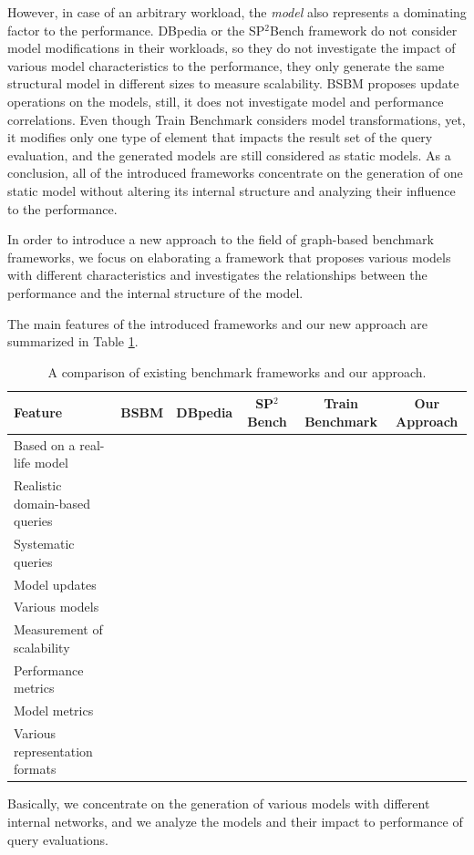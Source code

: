 However, in case of an arbitrary workload, the \textit{model} also represents a dominating factor to the performance. DBpedia or the SP$^2$Bench framework do not consider model modifications in their workloads, so they do not investigate the impact of various model characteristics to the performance, they only generate the same structural model in different sizes to measure scalability. BSBM proposes update operations on the models, still, it does not investigate model and performance correlations. Even though Train Benchmark considers model transformations, yet, it modifies only one type of element that impacts the result set of the query evaluation, and the generated models are still considered as static models. As a conclusion, all of the introduced frameworks concentrate on the generation of one static model without altering its internal structure and analyzing their influence to the performance.

In order to introduce a new approach to the field of graph-based benchmark frameworks, we focus on elaborating a framework that proposes various models with different characteristics and investigates the relationships between the performance and the internal structure of the model.

The main features of the introduced frameworks and our new approach are summarized in Table \ref{tab:framework_features}.
\begin{table}[ht]
	\footnotesize
	\centering
	\begin{tabular}{l c c c c c}
		\toprule
		Feature & BSBM & DBpedia & SP$^2$Bench & Train Benchmark & Our Approach\\ \hline
		\midrule
		Based on a real-life model &  & \textbullet & \textbullet & &  \\ \hline
		Realistic domain-based queries & \textbullet & \textbullet &  &  & \\ \hline
		Systematic queries  & &  & \textbullet & & \\ \hline
		Model updates & \textbullet &  &  & \textbullet & \\ \hline
		Various models &  &  &  & & \textbullet \\ \hline
		Measurement of scalability  & \textbullet & \textbullet & \textbullet & \textbullet & \textbullet\\ \hline
		Performance metrics  & \textbullet & \textbullet & \textbullet & &  \\ \hline
		Model metrics &  &  &  & & \textbullet \\ \hline
		Various representation formats & &  &  & \textbullet & \\ \hline
		\bottomrule
	\end{tabular}
	\caption{A comparison of existing benchmark frameworks and our approach.}
	\label{tab:framework_features}
\end{table}

Basically, we concentrate on the generation of various models with different internal networks, and we analyze the models and their impact to performance of query evaluations.